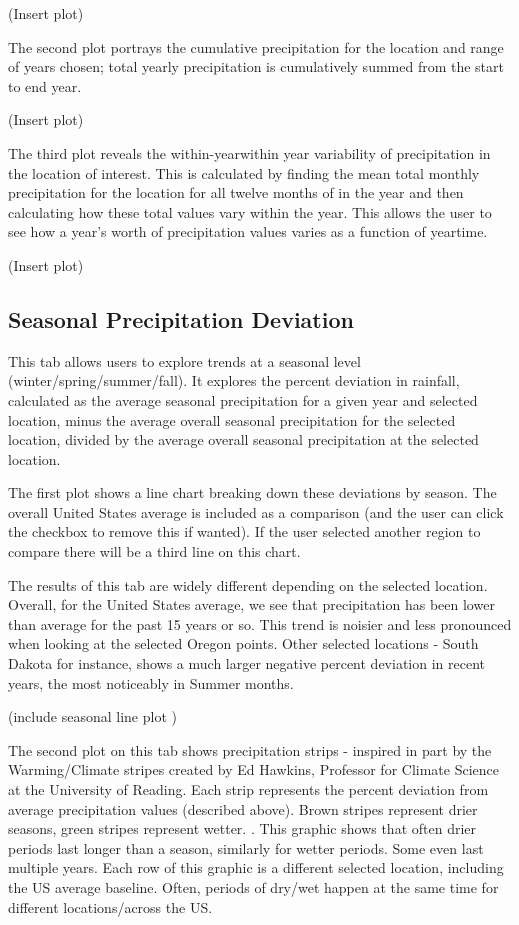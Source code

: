 \documentclass[10pt,letterpaper]{article}
\begin{document}
(Insert plot)

The second plot portrays the cumulative precipitation for the location and range of years chosen; total yearly precipitation is cumulatively summed from the start to end year.

(Insert plot)

The third plot reveals the within-yearwithin year variability of precipitation in the location of interest. This is calculated by finding the mean total monthly precipitation for the location for all twelve months of in the year and then calculating how these total values vary within the year. This allows the user to see how a year’s worth of precipitation values varies as a function of yeartime.

(Insert plot)

\subsection*{Seasonal Precipitation Deviation}

This tab allows users to explore trends at a seasonal level (winter/spring/summer/fall). It explores the percent deviation in rainfall, calculated as the average seasonal precipitation for a given year and selected location, minus the average overall seasonal precipitation for the selected location, divided by the average overall seasonal precipitation at the selected location.

The first plot shows a line chart breaking down these deviations by season. The overall United States average is included as a comparison (and the user can click the checkbox to remove this if wanted). If the user selected another region to compare there will be a third line on this chart.

The results of this tab are widely different depending on the selected location. Overall, for the United States average, we see that precipitation has been lower than average for the past 15 years or so. This trend is noisier and less pronounced when looking at the selected Oregon points. Other selected locations - South Dakota for instance, shows a much larger negative percent deviation in recent years, the most noticeably in Summer months.

(include seasonal line plot )

The second plot on this tab shows precipitation strips - inspired in part by the Warming/Climate stripes created by Ed Hawkins, Professor for Climate Science at the University of Reading. Each strip represents the percent deviation from average precipitation values (described above). Brown stripes represent drier seasons, green stripes represent wetter. . This graphic shows that often drier periods last longer than a season, similarly for wetter periods. Some even last multiple years. Each row of this graphic is a different selected location, including the US average baseline. Often, periods of dry/wet happen at the same time for different locations/across the US.
\end{document}
